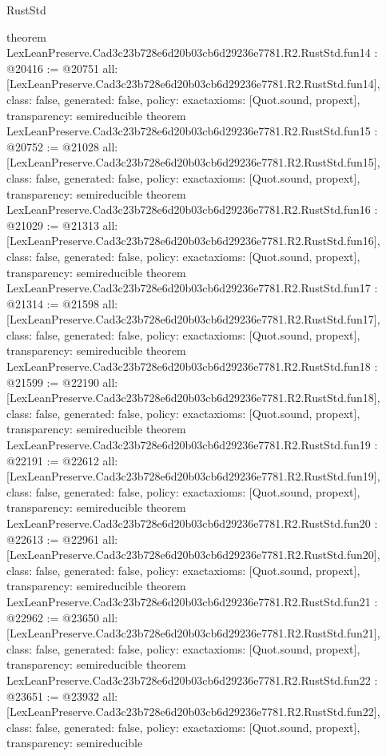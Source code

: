 \begin{lexlean}{RustStd}
\begin{coremodule}
{}
theorem LexLeanPreserve.Cad3c23b728e6d20b03cb6d29236e7781.R2.RustStd.fun14 : @20416 := @20751 {
  all: [LexLeanPreserve.Cad3c23b728e6d20b03cb6d29236e7781.R2.RustStd.fun14],
  class: false,
  generated: false,
  policy: exact{axioms: [Quot.sound, propext]},
  transparency: semireducible
}
theorem LexLeanPreserve.Cad3c23b728e6d20b03cb6d29236e7781.R2.RustStd.fun15 : @20752 := @21028 {
  all: [LexLeanPreserve.Cad3c23b728e6d20b03cb6d29236e7781.R2.RustStd.fun15],
  class: false,
  generated: false,
  policy: exact{axioms: [Quot.sound, propext]},
  transparency: semireducible
}
theorem LexLeanPreserve.Cad3c23b728e6d20b03cb6d29236e7781.R2.RustStd.fun16 : @21029 := @21313 {
  all: [LexLeanPreserve.Cad3c23b728e6d20b03cb6d29236e7781.R2.RustStd.fun16],
  class: false,
  generated: false,
  policy: exact{axioms: [Quot.sound, propext]},
  transparency: semireducible
}
theorem LexLeanPreserve.Cad3c23b728e6d20b03cb6d29236e7781.R2.RustStd.fun17 : @21314 := @21598 {
  all: [LexLeanPreserve.Cad3c23b728e6d20b03cb6d29236e7781.R2.RustStd.fun17],
  class: false,
  generated: false,
  policy: exact{axioms: [Quot.sound, propext]},
  transparency: semireducible
}
theorem LexLeanPreserve.Cad3c23b728e6d20b03cb6d29236e7781.R2.RustStd.fun18 : @21599 := @22190 {
  all: [LexLeanPreserve.Cad3c23b728e6d20b03cb6d29236e7781.R2.RustStd.fun18],
  class: false,
  generated: false,
  policy: exact{axioms: [Quot.sound, propext]},
  transparency: semireducible
}
theorem LexLeanPreserve.Cad3c23b728e6d20b03cb6d29236e7781.R2.RustStd.fun19 : @22191 := @22612 {
  all: [LexLeanPreserve.Cad3c23b728e6d20b03cb6d29236e7781.R2.RustStd.fun19],
  class: false,
  generated: false,
  policy: exact{axioms: [Quot.sound, propext]},
  transparency: semireducible
}
theorem LexLeanPreserve.Cad3c23b728e6d20b03cb6d29236e7781.R2.RustStd.fun20 : @22613 := @22961 {
  all: [LexLeanPreserve.Cad3c23b728e6d20b03cb6d29236e7781.R2.RustStd.fun20],
  class: false,
  generated: false,
  policy: exact{axioms: [Quot.sound, propext]},
  transparency: semireducible
}
theorem LexLeanPreserve.Cad3c23b728e6d20b03cb6d29236e7781.R2.RustStd.fun21 : @22962 := @23650 {
  all: [LexLeanPreserve.Cad3c23b728e6d20b03cb6d29236e7781.R2.RustStd.fun21],
  class: false,
  generated: false,
  policy: exact{axioms: [Quot.sound, propext]},
  transparency: semireducible
}
theorem LexLeanPreserve.Cad3c23b728e6d20b03cb6d29236e7781.R2.RustStd.fun22 : @23651 := @23932 {
  all: [LexLeanPreserve.Cad3c23b728e6d20b03cb6d29236e7781.R2.RustStd.fun22],
  class: false,
  generated: false,
  policy: exact{axioms: [Quot.sound, propext]},
  transparency: semireducible
}
\end{coremodule}
\end{lexlean}
